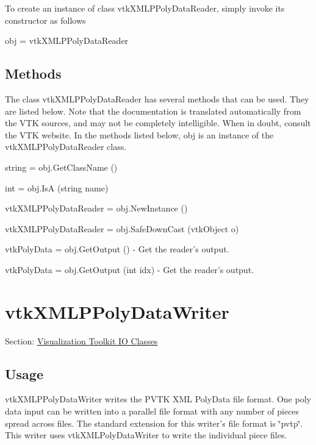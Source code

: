 To create an instance of class vtk\-X\-M\-L\-P\-Poly\-Data\-Reader, simply invoke its constructor as follows \begin{DoxyVerb}  obj = vtkXMLPPolyDataReader
\end{DoxyVerb}
 \hypertarget{vtkwidgets_vtkxyplotwidget_Methods}{}\subsection{Methods}\label{vtkwidgets_vtkxyplotwidget_Methods}
The class vtk\-X\-M\-L\-P\-Poly\-Data\-Reader has several methods that can be used. They are listed below. Note that the documentation is translated automatically from the V\-T\-K sources, and may not be completely intelligible. When in doubt, consult the V\-T\-K website. In the methods listed below, {\ttfamily obj} is an instance of the vtk\-X\-M\-L\-P\-Poly\-Data\-Reader class. 
\begin{DoxyItemize}
\item {\ttfamily string = obj.\-Get\-Class\-Name ()}  
\item {\ttfamily int = obj.\-Is\-A (string name)}  
\item {\ttfamily vtk\-X\-M\-L\-P\-Poly\-Data\-Reader = obj.\-New\-Instance ()}  
\item {\ttfamily vtk\-X\-M\-L\-P\-Poly\-Data\-Reader = obj.\-Safe\-Down\-Cast (vtk\-Object o)}  
\item {\ttfamily vtk\-Poly\-Data = obj.\-Get\-Output ()} -\/ Get the reader's output.  
\item {\ttfamily vtk\-Poly\-Data = obj.\-Get\-Output (int idx)} -\/ Get the reader's output.  
\end{DoxyItemize}\hypertarget{vtkio_vtkxmlppolydatawriter}{}\section{vtk\-X\-M\-L\-P\-Poly\-Data\-Writer}\label{vtkio_vtkxmlppolydatawriter}
Section\-: \hyperlink{sec_vtkio}{Visualization Toolkit I\-O Classes} \hypertarget{vtkwidgets_vtkxyplotwidget_Usage}{}\subsection{Usage}\label{vtkwidgets_vtkxyplotwidget_Usage}
vtk\-X\-M\-L\-P\-Poly\-Data\-Writer writes the P\-V\-T\-K X\-M\-L Poly\-Data file format. One poly data input can be written into a parallel file format with any number of pieces spread across files. The standard extension for this writer's file format is \char`\"{}pvtp\char`\"{}. This writer uses vtk\-X\-M\-L\-Poly\-Data\-Writer to write the individual piece files.

